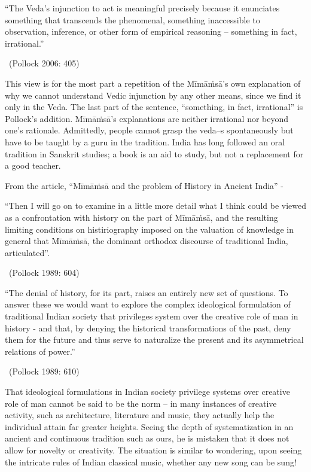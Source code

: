 \begin{myquote}
“The Veda’s injunction to act is meaningful precisely because it enunciates something that transcends the phenomenal, something inaccessible to observation, inference, or other form of empirical reasoning -- something in fact, irrational.” 

~\hfill (Pollock 2006: 405)
\end{myquote}

This view is for the most part a repetition of the Mīmāṁsā’s own explanation of why we cannot understand Vedic injunction by any other means, since we find it only in the Veda. The last part of the sentence, “something, in fact, irrational” is Pollock’s addition. Mīmāṁsā’s explanations are neither irrational nor beyond one’s rationale. Admittedly, people cannot grasp the veda--s spontaneously but have to be taught by a guru in the tradition. India has long followed an oral tradition in Sanskrit studies; a book is an aid to study, but not a replacement for a good teacher. 

From the article, “Mīmāṁsā and the problem of History in Ancient India” - 

\newpage

\begin{myquote}
“Then I will go on to examine in a little more detail what I think could be viewed as a confrontation with history on the part of Mīmāṁsā, and the resulting limiting conditions on histiriography imposed on the valuation of knowledge in general that Mīmāṁsā, the dominant orthodox discourse of traditional India, articulated”. 

~\hfill (Pollock 1989: 604)
\end{myquote}

\begin{myquote}
“The denial of history, for its part, raises an entirely new set of questions. To answer these we would want to explore the complex ideological formulation of traditional Indian society that privileges system over the creative role of man in history - and that, by denying the historical transformations of the past, deny them for the future and thus serve to naturalize the present and its asymmetrical relations of power.” 

~\hfill (Pollock 1989: 610)
\end{myquote}

That ideological formulations in Indian society privilege systems over creative role of man cannot be said to be the norm – in many instances of creative activity, such as architecture, literature and music, they actually help the individual attain far greater heights. Seeing the depth of systematization in an ancient and continuous tradition such as ours, he is mistaken that it does not allow for novelty or creativity. The situation is similar to wondering, upon seeing the intricate rules of Indian classical music, whether any new song can be sung! 

